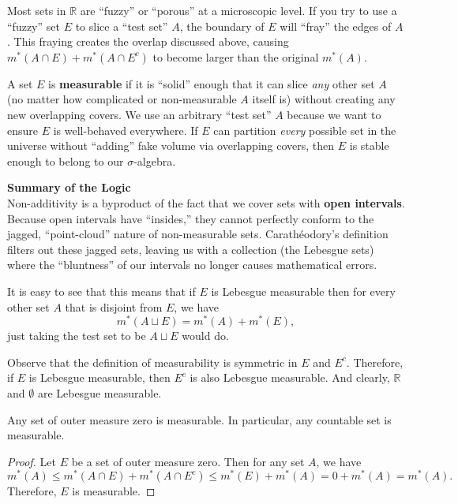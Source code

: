 \documentclass[../main.tex]{subfiles}
\begin{document}
\begin{remark}
	Most sets in $\mathbb{R}$ are ``fuzzy'' or ``porous'' at a microscopic level. If you try to use a ``fuzzy'' set $E$ to slice a ``test set'' $A$, the boundary of $E$ will ``fray'' the edges of $A$. This fraying creates the overlap discussed above, causing $m^*(A \cap E) + m^*(A \cap E^c)$ to become larger than the original $m^*(A)$.
	
	A set $E$ is \textbf{measurable} if it is ``solid'' enough that it can slice \textit{any} other set $A$ (no matter how complicated or non-measurable $A$ itself is) without creating any new overlapping covers. We use an arbitrary ``test set'' $A$ because we want to ensure $E$ is well-behaved everywhere. If $E$ can partition \textit{every} possible set in the universe without ``adding'' fake volume via overlapping covers, then $E$ is stable enough to belong to our $\sigma$-algebra.

	\vspace{1em}
	\noindent \textbf{Summary of the Logic} \\
	Non-additivity is a byproduct of the fact that we cover sets with \textbf{open intervals}. Because open intervals have ``insides,'' they cannot perfectly conform to the jagged, ``point-cloud'' nature of non-measurable sets. Carathéodory's definition filters out these jagged sets, leaving us with a collection (the Lebesgue sets) where the ``bluntness'' of our intervals no longer causes mathematical errors.
\end{remark}

It is easy to see that this means that if $E$ is Lebesgue measurable then for every other set $A$ that is disjoint from $E$, we have
\begin{equation*}
  m^*(A \sqcup E) = m^*(A) + m^*(E),
\end{equation*}
just taking the test set to be $A \sqcup E$ would do.

Observe that the definition of measurability is symmetric in $E$ and $E^c$. Therefore, if $E$ is Lebesgue measurable, then $E^c$ is also Lebesgue measurable. And clearly, $\mathbb{R}$ and $\emptyset$ are Lebesgue measurable.

\begin{proposition}{}{}
  Any set of outer measure zero is measurable. In particular, any countable set is measurable.
\end{proposition}
\begin{proof}
  Let $E$ be a set of outer measure zero. Then for any set $A$, we have
  \begin{equation*}
    m^*(A) \leq m^*(A \cap E) + m^*(A \cap E^c) \leq m^*(E) + m^*(A) = 0 + m^*(A) = m^*(A).
  \end{equation*}
  Therefore, $E$ is measurable.
\end{proof}
\end{document}
